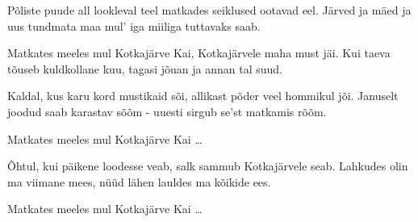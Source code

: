 P\~oliste puude all lookleval teel
matkades seiklused ootavad eel. 
J\"arved ja m\"aed ja uus tundmata maa
mul' iga miiliga tuttavaks saab.

Matkates meeles mul Kotkaj\"arve Kai,
Kotkaj\"arvele maha must j\"ai.
Kui taeva t\~ouseb kuldkollane kuu,
tagasi j\~ouan ja annan tal suud.

Kaldal, kus karu kord mustikaid s\~oi,
allikast p\~oder veel hommikul j\~oi.
Januselt joodud saab karastav s\~o\~om - 
uuesti sirgub se'st matkamis r\~o\~om.

Matkates meeles mul Kotkaj\"arve Kai \ldots

\~Ohtul, kui p\"aikene loodesse veab,
salk sammub Kotkaj\"arvele seab.
Lahkudes olin ma viimane mees, 
n\"u\"ud l\"ahen lauldes ma k\~oikide ees.

Matkates meeles mul Kotkaj\"arve Kai \ldots